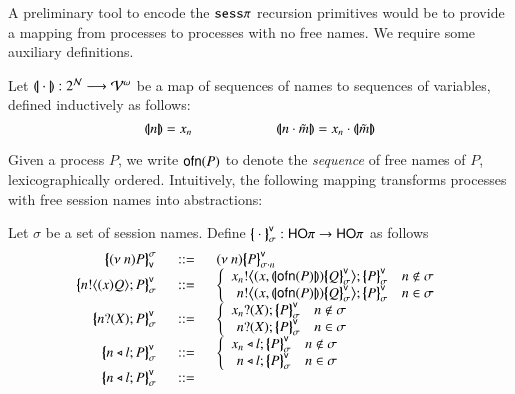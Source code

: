 A preliminary tool to encode the $\mathtt{sess}\pi$ recursion primitives would be to
provide a mapping from processes to processes with no free names.
We require some auxiliary definitions.
%
\begin{definition}\rm 
	Let $(\!|\!|\cdot|\!|\!): 2^{\mathcal{N}} \longrightarrow \mathcal{V}^\omega$
	be a map of sequences of names to sequences of variables, defined
	inductively as follows:
%
\[
	\vmap{n} = x_n \qquad \qquad \qquad \vmap{n \cat \tilde{m}} = x_n \cat \vmap{\tilde{m}}
\]
\end{definition}

Given a process $P$, we write $\mathsf{ofn}(P)$ to denote the
\emph{sequence} of free names of $P$, lexicographically ordered.
Intuitively, the following mapping transforms processes
with free session names into abstractions:
%
\begin{definition}\label{d:trabs}\rm
	Let $\sigma$ be a set of session names.
	Define $\big\{\!\!\big\{\cdot\big\}\!\!\big\}^\mathsf{v}_\sigma: \mathsf{HO}\pi \to \mathsf{HO}\pi$  as follows
%
\[
	\begin{array}{rcl}
		\auxmapp{\news{n} P}{\sigma}{\mathsf{v}} &\bnfis& \news{n} \auxmapp{P}{\mathsf{v}}{{\sigma \cat n}}\\
		\auxmapp{\bout{n}{\abs{x} Q} P}{\mathsf{v}}{\sigma} &\bnfis&
		\left\{
		\begin{array}{rl}
			\bbout{x_n}{\abs{x,\vmap{ \ofn{P}}} \auxmapp{Q}{\mathsf{v}}{\sigma}} \auxmapp{P}{\mathsf{v}}{\sigma} & n \notin \sigma\\
			\bbout{n}{\abs{x,\vmap{\ofn{P}}} \auxmapp{Q}{\mathsf{v}}{\sigma}} \auxmapp{P}{\mathsf{v}}{\sigma} & n \in \sigma
		\end{array}
		\right.
		\\
		\auxmapp{\binp{n}{X} P}{\mathsf{v}}{\sigma} &\bnfis&
		\left\{
		\begin{array}{rl}
			\binp{x_n}{X} \auxmapp{P}{\mathsf{v}}{\sigma} & n \notin \sigma\\
			\binp{n}{X} \auxmapp{P}{\mathsf{v}}{\sigma} & n \in \sigma
		\end{array}
		\right.
		\\
		\auxmapp{\bsel{n}{l} P}{\mathsf{v}}{\sigma} &\bnfis&
		\left\{
		\begin{array}{rl}
			\bsel{x_n}{l} \auxmapp{P}{\mathsf{v}}{\sigma} & n \notin \sigma\\
			\bsel{n}{l} \auxmapp{P}{\mathsf{v}}{\sigma} & n \in \sigma
		\end{array}
		\right.
		\\
		\auxmapp{\bsel{n}{l} P}{\mathsf{v}}{\sigma} &\bnfis&

\end{array}\]
\end{definition}
